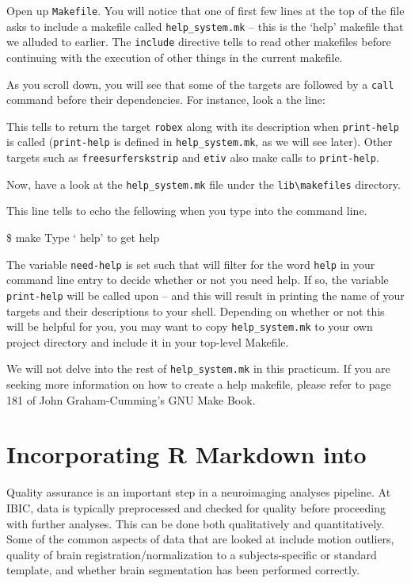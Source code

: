 Open up \texttt{Makefile}. You will notice that one of first few lines at the top of the file asks \maken{} to include a makefile called \texttt{help_system.mk} -- this is the `help' makefile that we alluded to earlier. The \texttt{include} directive tells \maken{} to read other makefiles before continuing with the execution of other things in the current makefile.  

As you scroll down, you will see that some of the targets are followed by a \texttt{call} command before their dependencies. For instance, look a the line:

This tells \maken{} to return the target \texttt{robex} along with its description when \texttt{print-help} is called (\texttt{print-help} is defined in \texttt{help_system.mk}, as we will see later). Other targets such as \texttt{freesurferskstrip} and \texttt{etiv} also make calls to \texttt{print-help}.

Now, have a look at the \texttt{help_system.mk} file under the \texttt{lib\textbackslash makefiles} directory.  

This line tells \maken{} to echo the fellowing when you type \maken{} into the command line.
\begin{bash}
\$ make
Type `\maken{} help' to get help
\end{bash}

The variable \texttt{need-help} is set such that \maken{} will filter for the word \texttt{help} in your command line entry to decide whether or not you need help. If so, the variable \texttt{print-help} will be called upon -- and this will result in \maken{} printing the name of your targets and their descriptions to your shell. Depending on whether or not this will be helpful for you, you may want to copy \texttt{help_system.mk} to your own project directory and include it in your top-level Makefile. 

We will not delve into the rest of \texttt{help_system.mk} in this practicum. If you are seeking more information on how to create a help makefile, please refer to page 181 of John Graham-Cumming's GNU Make Book. 

\section{Incorporating R Markdown into \maken{}}
Quality assurance is an important step in a neuroimaging analyses pipeline. At IBIC, data is typically  preprocessed and checked for quality before proceeding with further analyses. This can be done both qualitatively and quantitatively. Some of the common aspects of data that are looked at include motion outliers, quality of brain registration/normalization to a subjects-specific or standard template, and whether brain segmentation has been performed correctly. 

